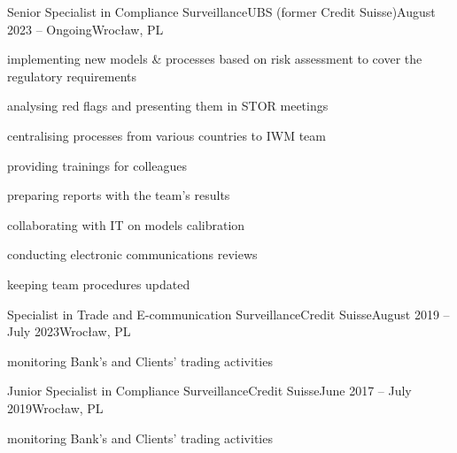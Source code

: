 
\begin{cveventi}{Senior Specialist in Compliance Surveillance}{UBS (former Credit Suisse)}{August 2023 -- Ongoing}{Wroc\l aw, PL}
	\item implementing new models \& processes based on risk assessment to cover the regulatory requirements
	\item analysing red flags and presenting them in STOR meetings
	\item centralising processes from various countries to IWM team
	\item providing trainings for colleagues
	\item preparing reports with the team's results
	\item collaborating with IT on models calibration
	\item conducting electronic communications reviews
	\item keeping team procedures updated
\end{cveventi}
%
\divider
\begin{cveventis}{Specialist in Trade and E-communication Surveillance}{Credit Suisse}{August 2019 -- July 2023}{Wroc\l aw, PL}
	\item monitoring Bank's and Clients' trading activities
\end{cveventis}
%
\divider
\begin{cveventis}{Junior Specialist in Compliance Surveillance}{Credit Suisse}{June 2017 -- July 2019}{Wroc\l aw, PL}
	\item monitoring Bank’s and Clients' trading activities
\end{cveventis}




